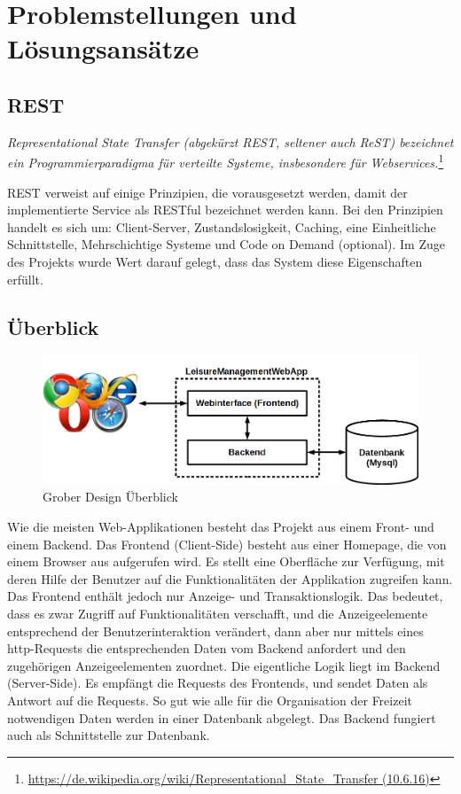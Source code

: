 \section{Problemstellungen und Lösungsansätze}

\subsection{REST}
\textit{Representational State Transfer (abgekürzt REST, seltener auch ReST) bezeichnet ein Programmierparadigma für verteilte Systeme, insbesondere für Webservices.}\vspace{5mm}\footnote{\url{https://de.wikipedia.org/wiki/Representational_State_Transfer (10.6.16)}}

REST verweist auf einige Prinzipien, die vorausgesetzt werden, damit der implementierte Service als RESTful bezeichnet werden kann. Bei den Prinzipien handelt es sich um: Client-Server, Zustandslosigkeit, Caching, eine Einheitliche Schnittstelle, Mehrschichtige Systeme und Code on Demand (optional). Im Zuge des Projekts wurde Wert darauf gelegt, dass das System diese Eigenschaften erfüllt.

\subsection{Überblick}

\begin{figure}[h]
	\centering
	\includegraphics[width=0.7\linewidth]{2_solutions/pics/overview}
	\caption{Grober Design Überblick}
	\label{fig:overview}
\end{figure}

Wie die meisten Web-Applikationen besteht das Projekt aus einem Front- und einem Backend. Das Frontend (Client-Side) besteht aus einer Homepage, die von einem Browser aus aufgerufen wird. Es stellt eine Oberfläche zur Verfügung, mit deren Hilfe der Benutzer auf die Funktionalitäten der Applikation zugreifen kann. Das Frontend enthält jedoch nur Anzeige- und Transaktionslogik. Das bedeutet, dass es zwar Zugriff auf Funktionalitäten verschafft, und die Anzeigeelemente entsprechend der Benutzerinteraktion verändert, dann aber nur mittels eines http-Requests die entsprechenden Daten vom Backend anfordert und den zugehörigen Anzeigeelementen zuordnet. Die eigentliche Logik liegt im Backend (Server-Side). Es empfängt die Requests des Frontends, und sendet Daten als Antwort auf die Requests. So gut wie alle für die Organisation der Freizeit notwendigen Daten werden in einer Datenbank abgelegt. Das Backend fungiert auch als Schnittstelle zur Datenbank.   

